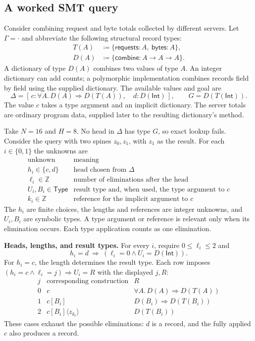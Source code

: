\documentclass[10pt,a4paper]{article}
\newcommand{\Int}{\mathsf{Int}}
\newcommand{\iarg}[1]{\langle#1\rangle}
\newcommand{\kw}[1]{\mathsf{#1}}
\begin{document}
\newpage
\subsection{A worked SMT query}
\label{sec:smt-example}
Consider combining request and byte totals collected by different servers. Let
$\Gamma=\cdot$ and abbreviate the following structural record types:
\[
\begin{aligned}
 T(A)&\coloneqq\{\kw{requests}:A,\ \kw{bytes}:A\},\\
 D(A)&\coloneqq\{\kw{combine}:A\to A\to A\}.
\end{aligned}
\]
A dictionary of type $D(A)$ combines two values of type $A$. An integer dictionary
can add counts; a polymorphic implementation combines records field by field using
the supplied dictionary. The available values and goal are
\[
 \Delta=[\,c:\forall A.\,D(A)\Rightarrow D(T(A)),\quad d:D(\Int)\,],
 \qquad G=D(T(\Int)).
\]
The value $c$ takes a type argument and an implicit dictionary. The server totals
are ordinary program data, supplied later to the resulting dictionary's method.

Take $N=16$ and $H=8$. No head in $\Delta$ has type $G$, so exact lookup fails.
Consider the query with two spines $z_0,z_1$, with $z_1$ as the result.
For each $i\in\{0,1\}$ the unknowns are
\[
\begin{array}{c|l}
 \text{unknown}&\text{meaning}\\\hline
 h_i\in\{c,d\}&\text{head chosen from }\Delta\\
 \ell_i\in\mathbb Z&\text{number of eliminations after the head}\\
 U_i, B_i\in\mathsf{Type}&\text{result type and, when used, the type argument to }c\\
 k_i\in\mathbb Z&\text{reference for the implicit argument to }c
\end{array}
\]
The $h_i$ are finite choices, the lengths and references are integer unknowns,
and $U_i,B_i$ are symbolic types. A type argument or reference is relevant only
when its elimination occurs. Each type application counts as one elimination.

\textbf{Heads, lengths, and result types.}
For every $i$, require $0\le\ell_i\le2$ and
\[
 h_i=d\ \Longrightarrow\ (\ell_i=0\land U_i=D(\Int)).
\]
For $h_i=c$, the length determines the result type. Each row imposes
$(h_i=c\land\ell_i=j)\Longrightarrow U_i=R$ with the displayed $j,R$:
\[
\begin{array}{c|l|l}
 j&\text{corresponding construction}&R\\\hline
 0&c&\forall A.\,D(A)\Rightarrow D(T(A))\\
 1&c[B_i]&D(B_i)\Rightarrow D(T(B_i))\\
 2&c[B_i]\iarg{z_{k_i}}&D(T(B_i))
\end{array}
\]
These cases exhaust the possible eliminations: $d$ is a record, and the fully
applied $c$ also produces a record.
\end{document}
